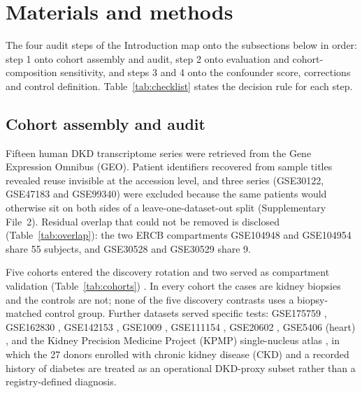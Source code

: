 \documentclass[unnumsec,webpdf,contemporary,large,numbered]{oup-authoring-template}
\begin{document}
\section{Materials and methods}\label{sec:methods}

The four audit steps of the Introduction map onto the subsections below in order: step 1 onto
cohort assembly and audit, step 2 onto evaluation and cohort-composition sensitivity, and steps 3
and 4 onto the confounder score, corrections and control definition.
Table~\ref{tab:checklist} states the decision rule for each step.

\subsection{Cohort assembly and audit}\label{sec:cohorts}

Fifteen human DKD transcriptome series were retrieved from the Gene Expression Omnibus (GEO).
Patient identifiers recovered from sample titles revealed reuse invisible at the accession level,
and three series (GSE30122, GSE47183 and GSE99340) were excluded because the same patients would
otherwise sit on both sides of a leave-one-dataset-out split (Supplementary File~2). Residual
overlap that could not be removed is disclosed (Table~\ref{tab:overlap}): the two ERCB
compartments GSE104948 and GSE104954 share 55 subjects, and GSE30528 and GSE30529 share 9.

Five cohorts entered the discovery rotation and two served as compartment validation
(Table~\ref{tab:cohorts}) \cite{woroniecka2011,pan2018,grayson2018,fan2019,jin2026}. In every
cohort the cases are kidney biopsies and the controls are not; none of the five discovery
contrasts uses a biopsy-matched control group. Further datasets served specific tests: GSE175759
\cite{park2022}, GSE162830 \cite{eadon2021}, GSE142153 \cite{sur2021}, GSE1009
\cite{baelde2004}, GSE111154 \cite{sircar2018}, GSE20602 \cite{neusser2010}, GSE5406 (heart)
\cite{hannenhalli2006}, and the Kidney Precision Medicine Project (KPMP) single-nucleus atlas
\cite{elachkar2021,lake2023}, in which the 27 donors enrolled with chronic kidney disease (CKD) and a
recorded history of diabetes are treated as an operational DKD-proxy subset rather than a
registry-defined diagnosis.
\end{document}
